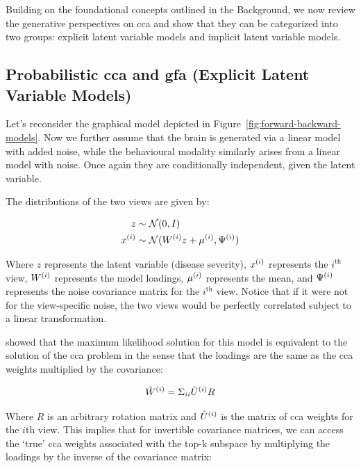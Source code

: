 Building on the foundational concepts outlined in the Background, we now review the generative perspectives on \acrshort{cca} and show that they can be categorized into two groups: explicit latent variable models and implicit latent variable models.

\subsection{Probabilistic \acrshort{cca} and \acrshort{gfa} (Explicit Latent Variable Models)}

Let's reconsider the graphical model depicted in Figure~\ref{fig:forward-backward-models}.
Now we further assume that the brain is generated via a linear model with added noise, while the behavioural modality similarly arises from a linear model with noise.
Once again they are conditionally independent, given the latent variable.

The distributions of the two views are given by:

\begin{align}
    z& \sim \mathcal{N}(0, I)\\
    x^{(i)} & \sim \mathcal{N}(W^{(i)} z + \mu^{(i)}, \Psi^{(i)})
\end{align}

Where \(z\) represents the latent variable (disease severity), \(x^{(i)}\) represents the $i^{\text{th}}$ view, \(W^{(i)}\) represents the model loadings, \(\mu^{(i)}\) represents the mean, and \(\Psi^{(i)}\) represents the noise covariance matrix for the $i^{\text{th}}$ view.
Notice that if it were not for the view-specific noise, the two views would be perfectly correlated subject to a linear transformation.

\citet{bach2005probabilistic} showed that the maximum likelihood solution for this model is equivalent to the solution of the \acrshort{cca} problem in the sense that the \gls{loadings} are the same as the \acrshort{cca} weights multiplied by the covariance:

\begin{align}
    \label{eq:loadings-to-weights}
    \hat{W}^{(i)} = \Sigma_{ii} \hat{U}^{(i)} R
\end{align}

Where $R$ is an arbitrary rotation matrix and $\hat{U}^{(i)}$ is the matrix of \acrshort{cca} weights for the $i$th view.
This implies that for invertible covariance matrices, we can access the `true' \acrshort{cca} weights associated with the top-k subspace by multiplying the \gls{loadings} by the inverse of the covariance matrix:

